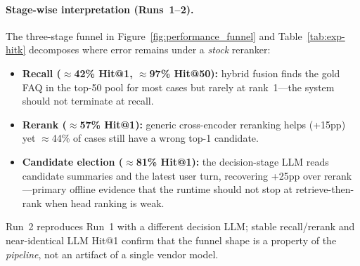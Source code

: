 \documentclass[sigconf,review]{acmart}
\begin{document}
\begin{table}[t]
  \caption{Issue-ID Hit@$K$ by pipeline stage. Recall: concatenated multi-turn user queries. LLM: last user turn only.}
  \label{tab:exp-hitk}
  \centering
  \footnotesize
  \setlength{\tabcolsep}{3pt}
  \renewcommand{\arraystretch}{1.05}
\end{table}

\paragraph{Stage-wise interpretation (Runs~1--2).}
The three-stage funnel in Figure~\ref{fig:performance_funnel} and Table~\ref{tab:exp-hitk} decomposes where error remains under a \emph{stock} reranker:
\begin{itemize}[leftmargin=1.2em]
  \item \textbf{Recall ($\approx$42\% Hit@1, $\approx$97\% Hit@50):} hybrid fusion finds the gold FAQ in the top-50 pool for most cases but rarely at rank~1---the system should not terminate at recall.
  \item \textbf{Rerank ($\approx$57\% Hit@1):} generic cross-encoder reranking helps (+15pp) yet $\approx$44\% of cases still have a wrong top-1 candidate.
  \item \textbf{Candidate election ($\approx$81\% Hit@1):} the decision-stage LLM reads candidate summaries and the latest user turn, recovering +25pp over rerank---primary offline evidence that the runtime should not stop at retrieve-then-rank when head ranking is weak.
\end{itemize}
Run~2 reproduces Run~1 with a different decision LLM; stable recall/rerank and near-identical LLM Hit@1 confirm that the funnel shape is a property of the \emph{pipeline}, not an artifact of a single vendor model.
\end{document}

